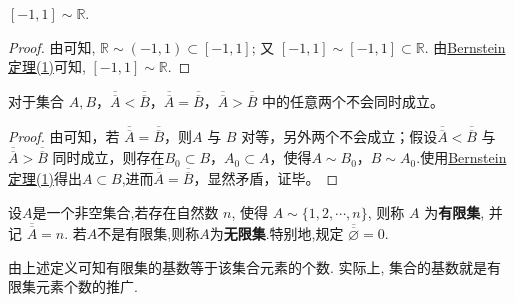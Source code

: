 \documentclass[../../main.tex]{subfiles}
\begin{document}
\begin{example}\label{example:[-1,1]与R对等}
$[-1, 1] \sim \mathbb{R}$.
\end{example}
\begin{proof}
由可知, $\mathbb{R} \sim (-1, 1) \subset [-1, 1]$; 又 $[-1, 1] \sim [-1, 1] \subset \mathbb{R}$. 由\hyperref[theorem:Bernstein定理]{Bernstein定理(1)}可知, $[-1, 1] \sim \mathbb{R}$.

\end{proof}

\begin{theorem}
对于集合 $A, B$，$\overline{\overline{A}} < \overline{\overline{B}}$，$\overline{\overline{A}} = \overline{\overline{B}}$，$\overline{\overline{A}} > \overline{\overline{B}}$ 中的任意两个不会同时成立。
\end{theorem}
\begin{proof}
由可知，若 $\overline{\overline{A}} = \overline{\overline{B}}$，则$A$ 与 $B$ 对等，另外两个不会成立；假设$\overline{\overline{A}} < \overline{\overline{B}}$ 与 $\overline{\overline{A}} > \overline{\overline{B}}$ 同时成立，则存在$B_0 \subset B$，$A_0 \subset A$，使得$A \sim B_0$，$B \sim A_0$.使用\hyperref[theorem:Bernstein定理]{Bernstein定理(1)}得出$A \subset B$,进而$\overline{\overline{A}} = \overline{\overline{B}}$，显然矛盾，证毕。

\end{proof}

\begin{definition}[有限集与无限集]\label{definition:有限集与无限集}
设$A$是一个非空集合,若存在自然数 $n$, 使得 $A \sim \{1, 2, \cdots, n\}$, 则称 $A$ 为\textbf{有限集}, 并记 $\overline{\overline{A}} = n$. 若$A$不是有限集,则称$A$为\textbf{无限集}.特别地,规定 $\overline{\overline{\varnothing}} = 0$.
\end{definition}
\begin{note}
由上述定义可知有限集的基数等于该集合元素的个数. 实际上, 集合的基数就是有限集元素个数的推广.
\end{note}
\end{document}
